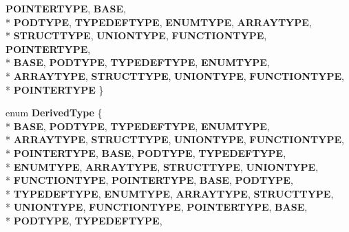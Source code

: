 \begin{DoxyCompactItemize}
{\bfseries P\-O\-I\-N\-T\-E\-R\-T\-Y\-P\-E}, 
{\bfseries B\-A\-S\-E}, 
\\*
{\bfseries P\-O\-D\-T\-Y\-P\-E}, 
{\bfseries T\-Y\-P\-E\-D\-E\-F\-T\-Y\-P\-E}, 
{\bfseries E\-N\-U\-M\-T\-Y\-P\-E}, 
{\bfseries A\-R\-R\-A\-Y\-T\-Y\-P\-E}, 
\\*
{\bfseries S\-T\-R\-U\-C\-T\-T\-Y\-P\-E}, 
{\bfseries U\-N\-I\-O\-N\-T\-Y\-P\-E}, 
{\bfseries F\-U\-N\-C\-T\-I\-O\-N\-T\-Y\-P\-E}, 
{\bfseries P\-O\-I\-N\-T\-E\-R\-T\-Y\-P\-E}, 
\\*
{\bfseries B\-A\-S\-E}, 
{\bfseries P\-O\-D\-T\-Y\-P\-E}, 
{\bfseries T\-Y\-P\-E\-D\-E\-F\-T\-Y\-P\-E}, 
{\bfseries E\-N\-U\-M\-T\-Y\-P\-E}, 
\\*
{\bfseries A\-R\-R\-A\-Y\-T\-Y\-P\-E}, 
{\bfseries S\-T\-R\-U\-C\-T\-T\-Y\-P\-E}, 
{\bfseries U\-N\-I\-O\-N\-T\-Y\-P\-E}, 
{\bfseries F\-U\-N\-C\-T\-I\-O\-N\-T\-Y\-P\-E}, 
\\*
{\bfseries P\-O\-I\-N\-T\-E\-R\-T\-Y\-P\-E}
 \}
\item 
enum {\bfseries Derived\-Type} \{ \\*
{\bfseries B\-A\-S\-E}, 
{\bfseries P\-O\-D\-T\-Y\-P\-E}, 
{\bfseries T\-Y\-P\-E\-D\-E\-F\-T\-Y\-P\-E}, 
{\bfseries E\-N\-U\-M\-T\-Y\-P\-E}, 
\\*
{\bfseries A\-R\-R\-A\-Y\-T\-Y\-P\-E}, 
{\bfseries S\-T\-R\-U\-C\-T\-T\-Y\-P\-E}, 
{\bfseries U\-N\-I\-O\-N\-T\-Y\-P\-E}, 
{\bfseries F\-U\-N\-C\-T\-I\-O\-N\-T\-Y\-P\-E}, 
\\*
{\bfseries P\-O\-I\-N\-T\-E\-R\-T\-Y\-P\-E}, 
{\bfseries B\-A\-S\-E}, 
{\bfseries P\-O\-D\-T\-Y\-P\-E}, 
{\bfseries T\-Y\-P\-E\-D\-E\-F\-T\-Y\-P\-E}, 
\\*
{\bfseries E\-N\-U\-M\-T\-Y\-P\-E}, 
{\bfseries A\-R\-R\-A\-Y\-T\-Y\-P\-E}, 
{\bfseries S\-T\-R\-U\-C\-T\-T\-Y\-P\-E}, 
{\bfseries U\-N\-I\-O\-N\-T\-Y\-P\-E}, 
\\*
{\bfseries F\-U\-N\-C\-T\-I\-O\-N\-T\-Y\-P\-E}, 
{\bfseries P\-O\-I\-N\-T\-E\-R\-T\-Y\-P\-E}, 
{\bfseries B\-A\-S\-E}, 
{\bfseries P\-O\-D\-T\-Y\-P\-E}, 
\\*
{\bfseries T\-Y\-P\-E\-D\-E\-F\-T\-Y\-P\-E}, 
{\bfseries E\-N\-U\-M\-T\-Y\-P\-E}, 
{\bfseries A\-R\-R\-A\-Y\-T\-Y\-P\-E}, 
{\bfseries S\-T\-R\-U\-C\-T\-T\-Y\-P\-E}, 
\\*
{\bfseries U\-N\-I\-O\-N\-T\-Y\-P\-E}, 
{\bfseries F\-U\-N\-C\-T\-I\-O\-N\-T\-Y\-P\-E}, 
{\bfseries P\-O\-I\-N\-T\-E\-R\-T\-Y\-P\-E}, 
{\bfseries B\-A\-S\-E}, 
\\*
{\bfseries P\-O\-D\-T\-Y\-P\-E}, 
{\bfseries T\-Y\-P\-E\-D\-E\-F\-T\-Y\-P\-E}, 

\end{DoxyCompactItemize}
